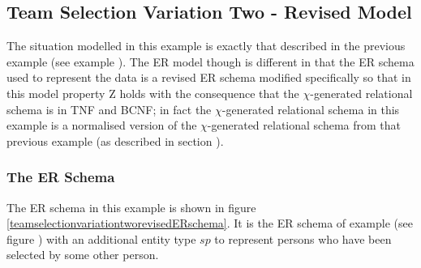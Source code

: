 \subsection{Team Selection Variation Two - Revised Model}

The situation modelled in this example is exactly that described in the previous example (see example ). 
The ER model though is different in that the ER schema used to represent the data  is a revised ER schema modified specifically so that in this model property Z holds with the consequence that the $\chi$-generated relational schema is in TNF and BCNF;  in fact the $\chi$-generated relational schema in this example is a normalised version of the $\chi$-generated relational schema from that 
previous example (as described in section ).

\subsubsection{The ER Schema}
The ER schema in this example is shown in figure \ref{teamselectionvariationtworevisedERschema}. It is the ER schema of example  (see figure 
) with an additional entity type $sp$ to represent persons who have been selected by some other person.


